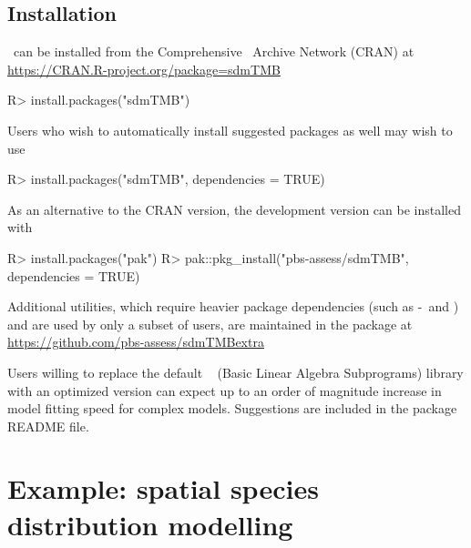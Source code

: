 \documentclass[article]{jss}\usepackage[]{graphicx}\usepackage[dvipsnames]{xcolor}
\newcommand{\sdmTMB}{\pkg{sdmTMB}}
\newcommand{\INLA}{\proglang{R}-\pkg{INLA}}
\newcommand{\R}{\proglang{R}}
\begin{document}
\subsection{Installation}\label{installation}

\sdmTMB\ can be installed from the Comprehensive \R\ Archive Network (CRAN) at\\
\url{https://CRAN.R-project.org/package=sdmTMB}

\begin{Schunk}
\begin{Sinput}
R> install.packages("sdmTMB")
\end{Sinput}
\end{Schunk}

Users who wish to automatically install suggested packages as well may wish to use

\begin{Schunk}
\begin{Sinput}
R> install.packages("sdmTMB", dependencies = TRUE)
\end{Sinput}
\end{Schunk}

As an alternative to the CRAN version, the development version can be installed with

\begin{Schunk}
\begin{Sinput}
R> install.packages("pak")
R> pak::pkg_install("pbs-assess/sdmTMB", dependencies = TRUE)
\end{Sinput}
\end{Schunk}

Additional utilities, which require heavier package dependencies (such as \INLA\ and ) and are used by only a subset of users, are maintained in the  package at\\
\url{https://github.com/pbs-assess/sdmTMBextra}

Users willing to replace the default \R\  (Basic Linear Algebra Subprograms) \citep{blas}
library with an optimized version \citep[e.g., ;][]{openblas}
can expect up to an order of magnitude increase in model fitting speed for complex models.
Suggestions are included in the package README file.

\section{Example: spatial species distribution modelling}\label{pcod}
\end{document}
